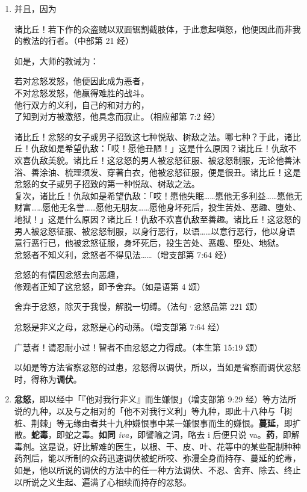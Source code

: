\begin{enumerate}
\item 并且，因为\begin{quoting}诸比丘！若下作的众盗贼以双面锯割截肢体，于此意起嗔怒，他便因此而非我的教法的行者。（中部第 21 经）\end{quoting}如是，大师的教诫为：\begin{quoting}若对忿怒发怒，他便因此成为恶者，\\不对忿怒发怒，他赢得难胜的战斗。\\他行双方的义利，自己的和对方的，\\了知到对方被激怒，他具念而寂止。（相应部第 7:2 经）\end{quoting}\begin{quoting}诸比丘！忿怒的女子或男子招致这七种悦敌、树敌之法。哪七种？于此，诸比丘！仇敌如是希望仇敌：「哎！愿他丑陋！」这是什么原因？诸比丘！仇敌不欢喜仇敌美貌。诸比丘！这忿怒的男人被忿怒征服、被忿怒制服，无论他善沐浴、善涂油、梳理须发、穿著白衣，他被忿怒征服，便是很丑。诸比丘！这是忿怒的女子或男子招致的第一种悦敌、树敌之法。\\复次，诸比丘！仇敌如是希望仇敌：「哎！愿他失眠……愿他无多利益……愿他无财富……愿他无名誉……愿他无朋友……愿他身坏死后，投生苦处、恶趣、堕处、地狱！」这是什么原因？诸比丘！仇敌不欢喜仇敌至善趣。诸比丘！这忿怒的男人被忿怒征服、被忿怒制服，以身行恶行，以语……以意行恶行，他以身语意行恶行已，他被忿怒征服，身坏死后，投生苦处、恶趣、堕处、地狱。\\忿怒者不知义利，忿怒者不得见法……（增支部第 7:64 经）\end{quoting}\begin{quoting}忿怒的有情因忿怒去向恶趣，\\修观者正知了这忿怒，即予舍弃。（如是语第 4 颂）\end{quoting}\begin{quoting}舍弃于忿怒，除灭于我慢，解脱一切缚。（法句·忿怒品第 221 颂）\end{quoting}\begin{quoting}忿怒是非义之母，忿怒是心的动荡。（增支部第 7:64 经）\end{quoting}\begin{quoting}广慧者！请忍耐小过！智者不由忿怒之力得成。（本生第 15:19 颂）\end{quoting}以如是等方法省察忿怒的过患，忿怒得以调伏，所以，当如是省察而调伏忿怒时，得称为\textbf{调伏}。
\item \textbf{忿怒}，即以经中「『他对我行非义』而生嫌恨」（增支部第 9:29 经）等方法所说的九种，以及与之相对的「他不对我行义利」等九种，即此十八种与「树桩、荆棘」等无缘由者共十九种嫌恨事中某一嫌恨事而生的嫌恨。\textbf{蔓延}，即扩散。\textbf{蛇毒}，即蛇之毒。\textbf{如同} \textit{iva}，即譬喻之词，略去 i 后便只说 va。\textbf{药}，即解毒剂。这是说，好比解难的医生，以根、干、皮、叶、花等中的某些配制种种药剂后，能以所制的众药迅速调伏被蛇所咬、弥漫全身而持存、蔓延的蛇毒，如是，他以所说的调伏的方法中的任一种方法调伏、不忍、舍弃、除去、终止以所说之义生起、遍满了心相续而持存的忿怒。

\end{enumerate}
